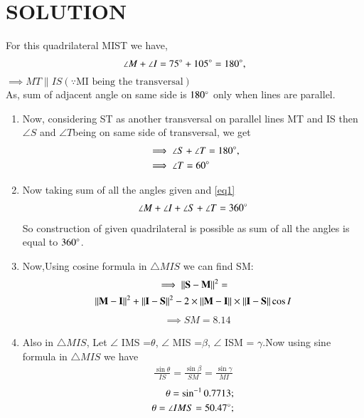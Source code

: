 \documentclass[journal,12pt,twocolumn]{IEEEtran}
\begin{document}
\section{SOLUTION}
For this quadrilateral MIST we have,
\begin{align}
\angle M +\angle I = 75\degree + 105\degree =180\degree,
\end{align}
$ \implies MT \parallel IS (\because \text {MI being the transversal})$
\\
As, sum of adjacent angle on same side is $180\degree$ only when lines are parallel.
\begin{enumerate}
    \item Now, considering ST as another transversal on parallel lines MT and IS then$\angle S$ and $\angle T $being on same side of transversal, we get
\begin{align}
&\implies \angle S + \angle T = 180\degree,
\\
&\implies \angle T = 60\degree\label{eq1}
\end{align}
 \item Now taking sum of all the angles given and \eqref{eq1}  
\begin{align}
\angle M + \angle I +\angle S +\angle T =360\degree
\end{align}
So construction of given quadrilateral is possible as sum of all the angles is equal to $360\degree$.
\\
 \item Now,Using cosine formula in $\triangle MIS$ we can find SM:
\begin{multline}
\implies {\Vert\mathbf{S}-\mathbf{M}\rVert^2}=
\\
{\Vert\mathbf{M}-\mathbf{I}\rVert^2}+ \Vert\mathbf{I}-\mathbf{S}\rVert^2-2\times\Vert\mathbf{M}-\mathbf{I}\rVert \times \Vert\mathbf{I}-\mathbf{S}\rVert\cos{I}
\end{multline}
\begin{align}
&\implies SM=8.14
\end{align}
\item Also in $\triangle MIS$, Let $\angle$ IMS =$\theta$, $\angle$ MIS =$\beta$, $\angle$ ISM = $\gamma$.Now using sine formula in $\triangle MIS$ we have
\begin{align}
\frac{{\sin \theta}}{IS} = \frac{{\sin \beta}}{SM} = \frac{{\sin \gamma}}{MI}
\end{align}
\begin{align}
\theta=\sin^{-1} 0.7713;
\\
\theta=\angle IMS= 50.47 \degree ;
\end{align}

\end{enumerate}
\end{document}
